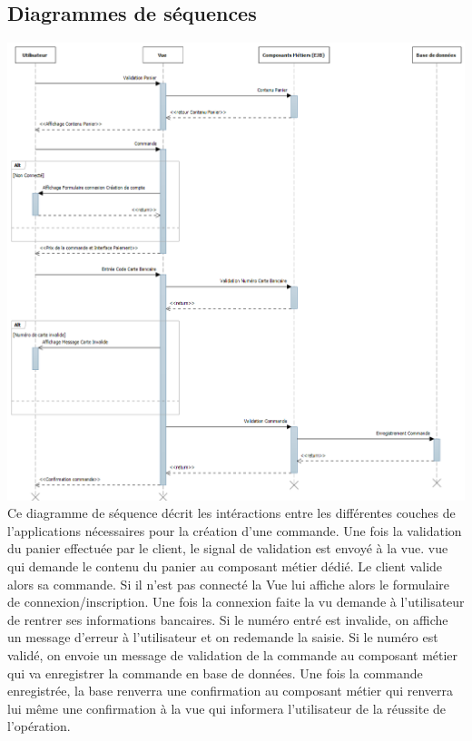 \subsection{Diagrammes de séquences}
\includegraphics[scale=0.39]{Res/sequenceDiagramOrder.png}
Ce diagramme de séquence décrit les intéractions entre les différentes couches de l'applications nécessaires pour la création d'une commande.
Une fois la validation du panier effectuée par le client, le signal de validation est envoyé à la vue. vue qui demande le contenu du panier au composant métier dédié.
Le client valide alors sa commande. Si il n'est pas connecté la Vue lui affiche alors le formulaire de connexion/inscription. Une fois la connexion faite la vu demande à l'utilisateur de rentrer
ses informations bancaires. Si le numéro entré est invalide, on affiche un message d'erreur  à l'utilisateur et on redemande la saisie.
Si le numéro est validé, on envoie un message de validation de  la commande au composant métier qui va enregistrer la commande en base de données.
Une fois la commande enregistrée, la base renverra une confirmation au composant métier qui renverra lui même une confirmation à la vue qui informera l'utilisateur de la réussite de l'opération.
\clearpage
